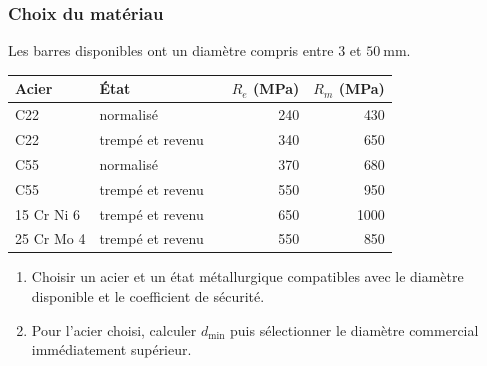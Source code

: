 \subsubsection{Choix du matériau}

Les barres disponibles ont un diamètre compris entre $3$ et $50\ \mathrm{mm}$.

\begin{center}
\small
\begin{tabular}{lllrr}
\toprule
Acier & État & & $R_e$ (MPa) & $R_m$ (MPa)\\
\midrule
C22 & normalisé && 240 & 430\\
C22 & trempé et revenu && 340 & 650\\
C55 & normalisé && 370 & 680\\
C55 & trempé et revenu && 550 & 950\\
15 Cr Ni 6 & trempé et revenu && 650 & 1000\\
25 Cr Mo 4 & trempé et revenu && 550 & 850\\
\bottomrule
\end{tabular}
\end{center}

\begin{enumerate}[resume]
  \item Choisir un acier et un état métallurgique compatibles avec le diamètre disponible et le coefficient de sécurité.
  \item Pour l'acier choisi, calculer $d_{\min}$ puis sélectionner le diamètre commercial immédiatement supérieur.
\end{enumerate}
